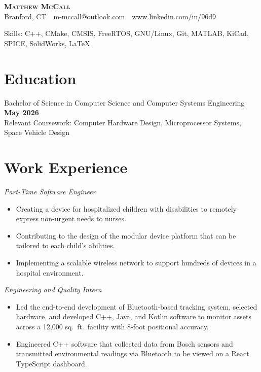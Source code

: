\documentclass[11pt]{article}
\begin{document}
\begin{center}
{\LARGE\bfseries\scshape Matthew McCall} \\
Branford, CT \,\textbullet\, m-mccall@outlook.com \,\textbullet\, www.linkedin.com/in/96d9
\end{center}

{\selectfont Skills:} C++, CMake, CMSIS, FreeRTOS, GNU/Linux, Git, MATLAB, KiCad, SPICE, SolidWorks, \LaTeX

\section*{Education}
Bachelor of Science in Computer Science and Computer Systems Engineering \hfill \textbf{May 2026} \\
{\selectfont Relevant Coursework:} Computer Hardware Design, Microprocessor Systems, Space Vehicle Design

\section*{Work Experience}

\textit{Part-Time Software Engineer}
\begin{itemize}
	\item Creating a device for hospitalized children with disabilities to remotely express non-urgent needs to nurses.
	\item Contributing to the design of the modular device platform that can be tailored to each child’s abilities.
	\item Implementing a scalable wireless network to support hundreds of devices in a hospital environment.
\end{itemize}

\textit{Engineering and Quality Intern}
\begin{itemize}
    \item Led the end-to-end development of Bluetooth-based tracking system, selected hardware, and developed C++, Java, and Kotlin software to monitor assets across a 12,000 sq.\ ft.\ facility with 8-foot positional accuracy.
    \item Engineered C++ software that collected data from Bosch sensors and transmitted environmental readings via Bluetooth to be viewed on a React TypeScript dashboard.
\end{itemize}
\end{document}
